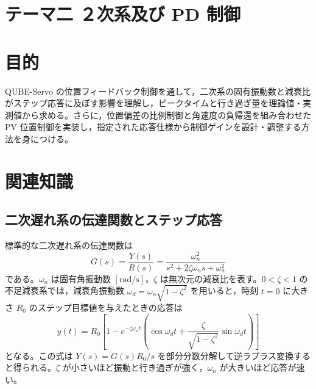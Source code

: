 \documentclass[dvipdfmx,a4paper,11pt]{jsarticle}
\begin{document}
\begin{jikkenTitle}
  \jikkenbi{}
  \kyoudou{}
  \preYoteibi{}\preTeishutsubi{}\repYoteibi{}\repTeishutsubi{}
\end{jikkenTitle}

\section*{テーマ二 ２次系及び PD 制御}
\section{目的}
QUBE-Servo の位置フィードバック制御を通して，二次系の固有振動数と減衰比がステップ応答に及ぼす影響を理解し，ピークタイムと行き過ぎ量を理論値・実測値から求める。さらに，位置偏差の比例制御と角速度の負帰還を組み合わせた PV 位置制御を実装し，指定された応答仕様から制御ゲインを設計・調整する方法を身につける。

\section{関連知識}
\subsection{二次遅れ系の伝達関数とステップ応答}
標準的な二次遅れ系の伝達関数は
\begin{equation}
 G(s)=\frac{Y(s)}{R(s)}=\frac{\omega_n^2}{s^2+2\zeta\omega_n s+\omega_n^2}
 \label{eq:standard}
\end{equation}
である。$\omega_n$ は固有角振動数 $[\mathrm{rad/s}]$，$\zeta$ は無次元の減衰比を表す。$0<\zeta<1$ の不足減衰系では，減衰角振動数 $\omega_d=\omega_n\sqrt{1-\zeta^2}$ を用いると，時刻 $t=0$ に大きさ $R_0$ のステップ目標値を与えたときの応答は
\begin{equation}
 y(t)=R_0\left[1-e^{-\zeta\omega_n t}\left(\cos\omega_d t+\frac{\zeta}{\sqrt{1-\zeta^2}}\sin\omega_d t\right)\right]
 \label{eq:step2}
\end{equation}
となる。この式は $Y(s)=G(s)R_0/s$ を部分分数分解して逆ラプラス変換すると得られる。$\zeta$ が小さいほど振動と行き過ぎが強く，$\omega_n$ が大きいほど応答が速い。
\end{document}
